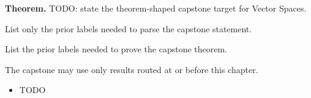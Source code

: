 \label{cap:vector-spaces}

\begin{tcolorbox}[
  colback=gray!6,
  colframe=gray!40,
  arc=2pt,
  left=8pt, right=8pt, top=6pt, bottom=6pt,
  title={\small\textbf{Capstone Theorem}},
  fonttitle=\small\bfseries
]
\textbf{Theorem.}
TODO: state the theorem-shaped capstone target for Vector Spaces.
\end{tcolorbox}

\begin{remark*}
List only the prior labels needed to parse the capstone statement.
\end{remark*}

\begin{remark*}
List the prior labels needed to prove the capstone theorem.
\end{remark*}

\begin{remark*}
The capstone may use only results routed at or before this chapter.
\end{remark*}

\begin{dependencies}
\begin{itemize}
  \item TODO
\end{itemize}
\end{dependencies}

\clearpage
